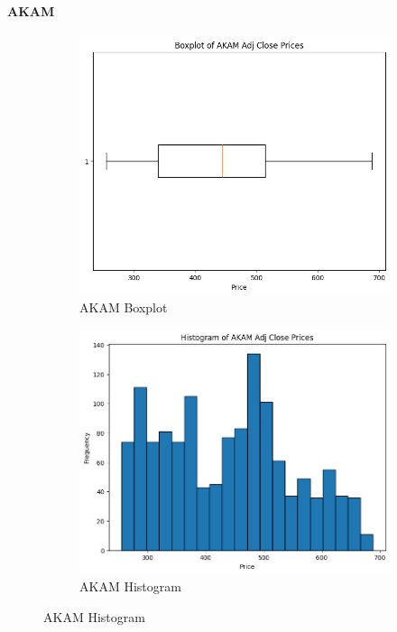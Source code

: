 \documentclass{ieeeojies}
\begin{document}
\paragraph{AKAM}
\begin{figure}[H]
    \begin{subfigure}{0.4\linewidth}
        \centering
        \includegraphics[width=\linewidth]{AKAM1.png}
        \caption{AKAM Boxplot}
        \label{fig:adbe-7-3}
    \end{subfigure}%
    \hfill
    \begin{subfigure}{0.4\linewidth}
        \centering
        \includegraphics[width=\linewidth]{AKAM2.png}
        \caption{AKAM Histogram}
        \label{fig:adbe-8-2}
    \end{subfigure}%
\end{figure}
\end{document}
